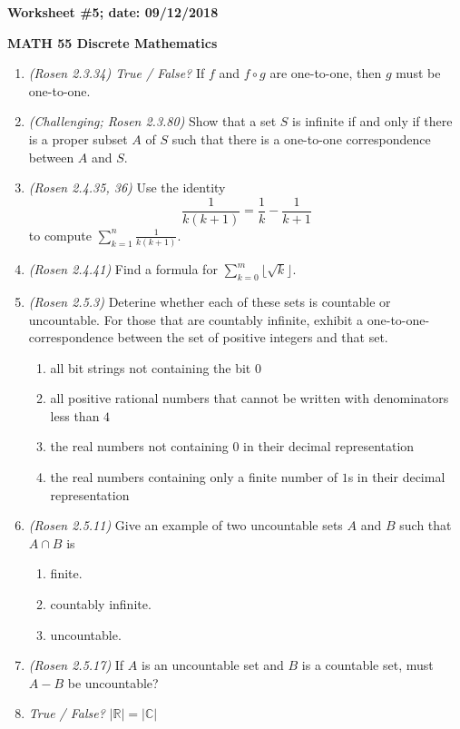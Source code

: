 \documentclass{article}
\newcommand{\RR}{\mathbb{R}}
\newcommand{\CC}{\mathbb{C}}
\begin{document}
{\bf Worksheet \#5; date: 09/12/2018}

{\bf MATH 55 Discrete Mathematics}

\begin{enumerate}
\item {\em (Rosen 2.3.34) True / False?} If $f$ and $f \circ g$ are one-to-one, then $g$ must be one-to-one.

\item {\em (Challenging; Rosen 2.3.80)} Show that a set $S$ is infinite if and only if there is a proper subset $A$ of $S$ such that there is a one-to-one correspondence between $A$ and $S$.

\item {\em (Rosen 2.4.35, 36)} Use the identity
\[
\frac{1}{k(k+1)} = \frac{1}{k} - \frac{1}{k+1}
\]
to compute $\sum_{k=1}^n \frac{1}{k(k+1)}$.

\item {\em (Rosen 2.4.41)} Find a formula for $\sum_{k=0}^m \lfloor \sqrt{k} \rfloor$.

\item {\em (Rosen 2.5.3)} Deterine whether each of these sets is countable or uncountable. For those that are countably infinite, exhibit a one-to-one- correspondence between the set of positive integers and that set.
\begin{enumerate}
\item all bit strings not containing the bit $0$
\item all positive rational numbers that cannot be written with denominators less than $4$
\item the real numbers not containing $0$ in their decimal representation
\item the real numbers containing only a finite number of $1$s in their decimal representation
\end{enumerate}

\item {\em (Rosen 2.5.11)} Give an example of two uncountable sets $A$ and $B$ such that $A \cap B$ is
\begin{enumerate}
\item finite.
\item countably infinite.
\item uncountable.
\end{enumerate}

\item {\em (Rosen 2.5.17)} If $A$ is an uncountable set and $B$ is a countable set, must $A - B$ be uncountable?

\item {\em True / False?} $|\RR| = |\CC|$

\end{enumerate}
\end{document}
